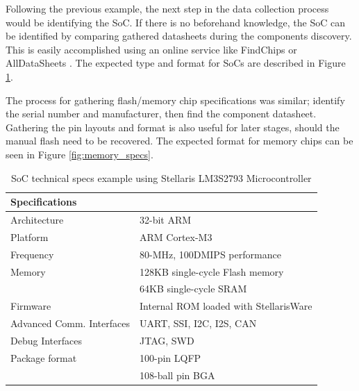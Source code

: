 Following the previous example, the next step in the data collection process would be identifying the SoC. If there is no beforehand knowledge, the SoC can be identified by comparing gathered datasheets during the components discovery. This is easily accomplished using an online service like FindChips or AllDataSheets \autocite{FindchipsElectronicPart}. The expected type and format for SoCs are described in Figure \ref{fig:soc_specs}.

The process for gathering flash/memory chip specifications was similar; identify the serial number and manufacturer, then find the component datasheet. Gathering the pin layouts and format is also useful for later stages, should the manual flash need to be recovered. The expected format for memory chips can be seen in Figure \ref{fig:memory_specs}.

\begin{table}
  \centering
  \label{fig:soc_specs}%
  \caption{SoC technical specs example using Stellaris LM3S2793 Microcontroller}
  \begin{tabular}{|p{4cm}|p{12cm}|}
    \hline\rowcolor{gray!30}

    \textbf{Specifications} &  \\
    \hline

    Architecture & 32-bit ARM \\
    \hline

    Platform & ARM Cortex-M3 \\
    \hline

    Frequency & 80-MHz, 100DMIPS performance \\
    \hline

    Memory & 128KB single-cycle Flash memory \\
     & 64KB single-cycle SRAM \\
    \hline

    Firmware & Internal ROM loaded with StellarisWare \\
    \hline

    Advanced Comm. Interfaces & UART, SSI, I2C, I2S, CAN \\
    \hline

    Debug Interfaces & JTAG, SWD \\
    \hline

    Package format & 100-pin LQFP \\
    & 108-ball pin BGA \\
    \hline

  \end{tabular}
\end{table}

